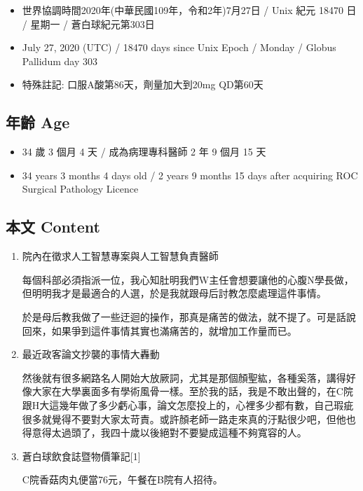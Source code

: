 \documentclass[a5paper, 11pt
]{book}
\providecommand{\tightlist}{%
  \setlength{\itemsep}{0pt}\setlength{\parskip}{0pt}}
\begin{document}
\begin{itemize}
\tightlist
\item
  世界協調時間2020年(中華民國109年，令和2年)7月27日 / Unix 紀元 18470 日
  / 星期一 / 蒼白球紀元第303日
\item
  July 27, 2020 (UTC) / 18470 days since Unix Epoch / Monday / Globus
  Pallidum day 303
\item
  特殊註記: 口服A酸第86天，劑量加大到20mg QD第60天
\end{itemize}

\hypertarget{ux5e74ux9f61-age-49}{%
\subsection{年齡 Age}\label{ux5e74ux9f61-age-49}}

\begin{itemize}
\tightlist
\item
  34 歲 3 個月 4 天 / 成為病理專科醫師 2 年 9 個月 15 天
\item
  34 years 3 months 4 days old / 2 years 9 months 15 days after
  acquiring ROC Surgical Pathology Licence
\end{itemize}

\hypertarget{ux672cux6587-content-49}{%
\subsection{本文 Content}\label{ux672cux6587-content-49}}

\begin{enumerate}
\def\labelenumi{\arabic{enumi}.}
\item
  院內在徵求人工智慧專案與人工智慧負責醫師

  每個科部必須指派一位，我心知肚明我們W主任會想要讓他的心腹N學長做，但明明我才是最適合的人選，於是我就跟母后討教怎麼處理這件事情。

  於是母后教我做了一些迂迴的操作，那真是痛苦的做法，就不提了。可是話說回來，如果爭到這件事情其實也滿痛苦的，就增加工作量而已。
\item
  最近政客論文抄襲的事情大轟動

  然後就有很多網路名人開始大放厥詞，尤其是那個顏聖紘，各種奚落，講得好像大家在大學裏面多有學術風骨一樣。至於我的話，我是不敢出聲的，在C院跟H大這幾年做了多少虧心事，論文怎麼投上的，心裡多少都有數，自己瑕疵很多就覺得不要對大家太苛責。或許顏老師一路走來真的汙點很少吧，但他也得意得太過頭了，我四十歲以後絕對不要變成這種不夠寬容的人。
\item
  蒼白球飲食誌暨物價筆記{[}1{]}

  C院香菇肉丸便當76元，午餐在B院有人招待。
\end{enumerate}
\end{document}
